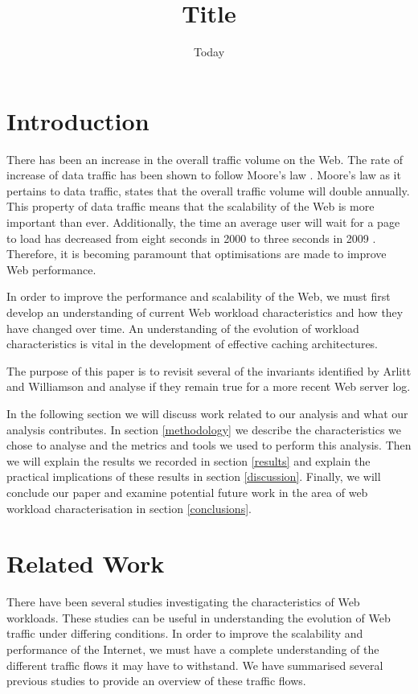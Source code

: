 \documentclass[10pt,conference]{IEEEtran}
\title{Title}
\author{\IEEEauthorblockN{Chelsea Farley, Ryan Lewis, David Armstrong, Rina Gao and Ryunosuke Madenokoji}
\IEEEauthorblockA{The University of Auckland}}
\date{Today}
\begin{document}
\maketitle

\begin{abstract}
\end{abstract}

\section{Introduction}
There has been an increase in the overall traffic volume on the Web. The rate of increase of data traffic has been shown to follow Moore's law \cite{williams05}. Moore's law as it pertains to data traffic, states that the overall traffic volume will double annually. This property of data traffic means that the scalability of the Web is more important than ever. Additionally, the time an average user will wait for a page to load has decreased from eight seconds in 2000 to three seconds in 2009 \cite{Butkiewicz}. Therefore, it is becoming paramount that optimisations are made to improve Web performance.

In order to improve the performance and scalability of the Web, we must first develop an understanding of current Web workload characteristics and how they have changed over time. An understanding of the evolution of workload characteristics is vital in the development of effective caching architectures.

The purpose of this paper is to revisit several of the invariants identified by Arlitt and Williamson \cite{keynote} and analyse if they remain true for a more recent Web server log.

In the following section we will discuss work related to our analysis and what our analysis contributes. In section \ref{methodology} we describe the characteristics we chose to analyse and the metrics and tools we used to perform this analysis. Then we will explain the results we recorded in section \ref{results} and explain the practical implications of these results in section \ref{discussion}. Finally, we will conclude our paper and examine potential future work in the area of web workload characterisation in section \ref{conclusions}.

\section{Related Work}\label{related_work}
There have been several studies investigating the characteristics of Web workloads. These studies can be useful in understanding the evolution of Web traffic under differing conditions. In order to improve the scalability and performance of the Internet, we must have a complete understanding of the different traffic flows it may have to withstand. We have summarised several previous studies to provide an overview of these traffic flows. 
\end{document}

